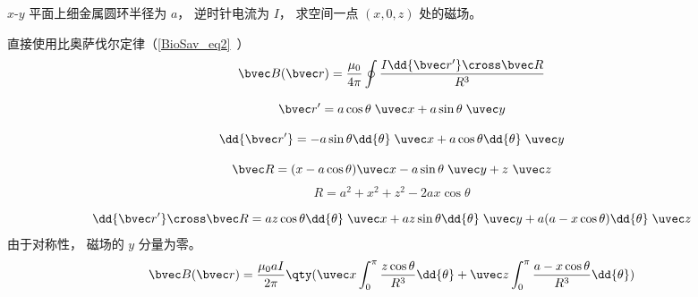 
\begin{issues}
\issueDraft
\end{issues}


$x$-$y$ 平面上细金属圆环半径为 $a$， 逆时针电流为 $I$， 求空间一点 $(x, 0, z)$ 处的磁场。

直接使用比奥萨伐尔定律（\autoref{BioSav_eq2}~）
\begin{equation}
\bvec B(\bvec r) = \frac{\mu_0}{4\pi} \oint \frac{I \dd{\bvec r'} \cross \bvec R}{R^3}
\end{equation}

\begin{equation}
\bvec r' = a\cos\theta\; \uvec x + a\sin\theta\; \uvec y
\end{equation}

\begin{equation}
\dd{\bvec r'} = -a\sin \theta \dd{\theta}\; \uvec x + a\cos \theta \dd{\theta}\; \uvec y
\end{equation}

\begin{equation}
\bvec R = (x - a\cos\theta)\uvec x - a\sin\theta \;\uvec y+ z\ \uvec z
\end{equation}
\begin{equation}
R = a^2 + x^2 + z^2 - 2ax\cos\theta
\end{equation}

\begin{equation}
\dd{\bvec r'} \cross \bvec R = az \cos\theta \dd{\theta} \;\uvec x + az\sin\theta \dd{\theta} \;\uvec y + a(a - x\cos\theta)\dd{\theta}\;\uvec z
\end{equation}
由于对称性， 磁场的 $y$ 分量为零。
\begin{equation}
\bvec B(\bvec r) = \frac{\mu_0 a I}{2\pi} \qty(\uvec x\int_0^\pi \frac{z \cos\theta}{R^3} \dd{\theta} + \uvec z\int_0^\pi \frac{a - x\cos\theta}{R^3} \dd{\theta})
\end{equation}
